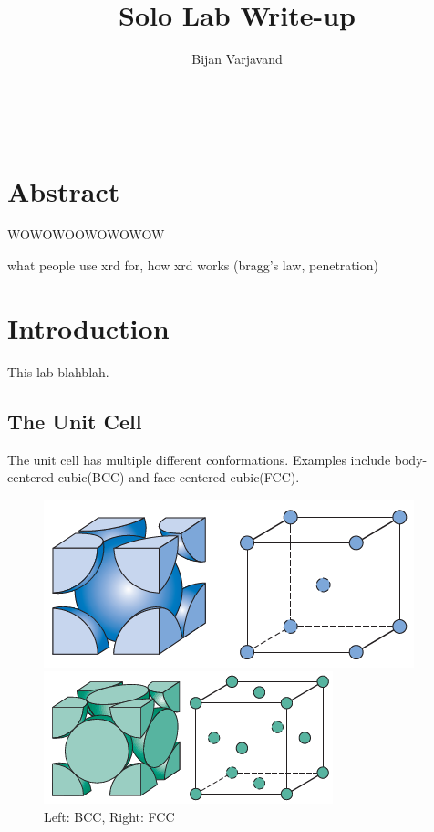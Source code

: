 \documentclass{article}
\author{Bijan Varjavand}
\title{Solo Lab Write-up}
\begin{document}
\maketitle
\ \\[2in]

\section{Abstract}
\centering
WOWOWOOWOWOWOW

\clearpage

what people use xrd for, how xrd works (bragg's law, penetration)
\raggedright
\section{Introduction}

This lab blahblah.

\subsection{The Unit Cell}

The unit cell has multiple different conformations. Examples include body-centered cubic(BCC) and face-centered cubic(FCC).

\begin{figure}[h]
	\begin{minipage}{0.5\textwidth}
		\centering
		\includegraphics[scale=.5]{bcc.png}
	\end{minipage}
	\begin{minipage}{0.5\textwidth}
		\centering
		\includegraphics[scale=.6]{fcc.png}
	\end{minipage}
	\caption{Left: BCC, Right: FCC}
\end{figure}
\end{document}
